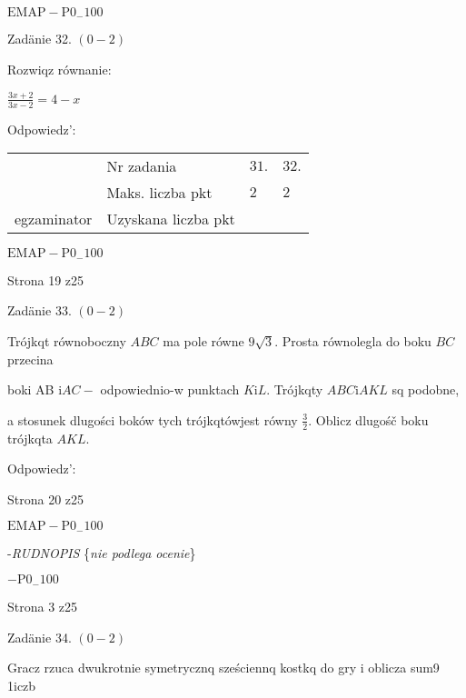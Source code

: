 \documentclass[a4paper,12pt]{article}
\begin{document}
$\mathrm{E}\mathrm{M}\mathrm{A}\mathrm{P}-\mathrm{P}0_{-}100$





Zadänie 32. $(0-2)$

Rozwiqz równanie:

$\displaystyle \frac{3x+2}{3x-2}=4-x$

Odpowiedz':
\begin{center}
\begin{tabular}{|l|l|l|l|}
\cline{2-4}
&	\multicolumn{1}{|l|}{Nr zadania}&	\multicolumn{1}{|l|}{$31.$}&	\multicolumn{1}{|l|}{ $32.$}	\\
\cline{2-4}
&	\multicolumn{1}{|l|}{Maks. liczba pkt}&	\multicolumn{1}{|l|}{$2$}&	\multicolumn{1}{|l|}{ $2$}	\\
\cline{2-4}
\multicolumn{1}{|l|}{egzaminator}&	\multicolumn{1}{|l|}{Uzyskana liczba pkt}&	\multicolumn{1}{|l|}{}&	\multicolumn{1}{|l|}{}	\\
\hline
\end{tabular}

\end{center}
$\mathrm{E}\mathrm{M}\mathrm{A}\mathrm{P}-\mathrm{P}0_{-}100$

Strona 19 z25





Zadänie 33. $(0-2)$

Trójkqt równoboczny $ABC$ ma pole równe $9\sqrt{3}$. Prosta równolegla do boku $BC$ przecina

boki AB $\mathrm{i} AC -$ odpowiednio-w punktach $K \mathrm{i} L$. Trójkqty $ABC \mathrm{i} AKL$ sq podobne,

a stosunek dlugości boków tych trójkqtówjest równy $\displaystyle \frac{3}{2}$. Oblicz dlugośč boku trójkqta $AKL.$

Odpowiedz':

Strona 20 z25

$\mathrm{E}\mathrm{M}\mathrm{A}\mathrm{P}-\mathrm{P}0_{-}100$





-{\it RUDNOPIS} \{{\it nie podlega ocenie}\}

$-\mathrm{P}0_{-}100$

Strona 3 z25





Zadänie 34. $(0-2)$

Gracz rzuca dwukrotnie symetrycznq sześciennq kostkq do gry i oblicza sum9 1iczb
\end{document}
